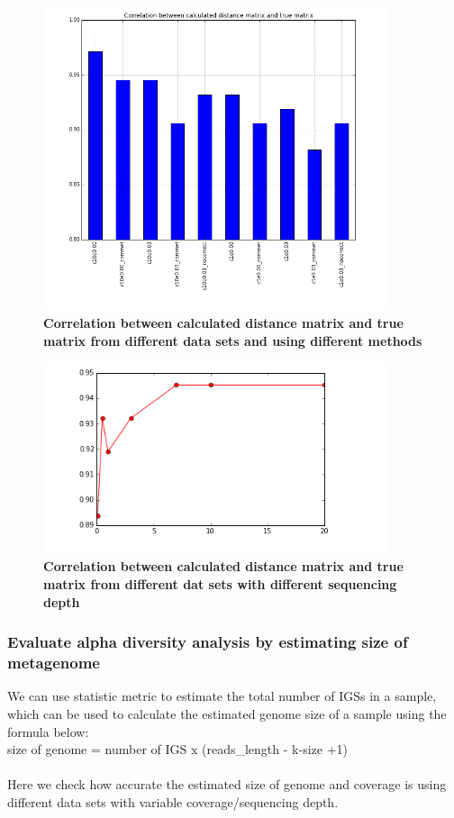 \begin{figure}[!ht]
 \centerline{\includegraphics[width=4in]{./figures/IGS_correlation_methods.png}}
\caption{\bf Correlation between calculated distance matrix and true matrix from different data sets and using different methods}
\label{fig:IGS_correlation_methods}
\end{figure}


\begin{figure}[!ht]
 \centerline{\includegraphics[width=4in]{./figures/IGS_correlation_coverage.png}}
\caption{\bf Correlation between calculated distance matrix and true matrix from different dat sets with different sequencing depth}
\label{fig:IGS_correlation_coverage}
\end{figure}


\subsubsection{Evaluate alpha diversity analysis by estimating size of metagenome}

We can use statistic metric to estimate the total number of IGSs in a sample, which can be used to calculate the estimated genome size of a sample using the formula below:
\\
size of genome = number of IGS x (reads\_length - k-size +1)\\
\\
Here we check how accurate the estimated size of genome and coverage is using different data sets with variable coverage/sequencing depth.

